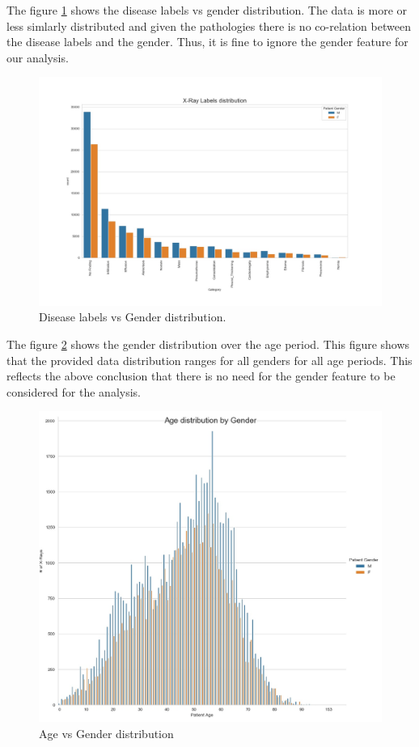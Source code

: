 \documentclass{article}
\begin{document}
    The figure \ref{fig:labels-vs-gender} shows the disease labels vs gender distribution. The data is more or less simlarly distributed and given the pathologies there is no co-relation between the disease labels and the gender. Thus, it is fine to ignore the gender feature for our analysis.

    \begin{figure}
      \includegraphics[width=\linewidth]{./images/labels_vs_gender.jpg}
      \caption{Disease labels vs Gender distribution.}
      \label{fig:labels-vs-gender}
    \end{figure}

    The figure \ref{fig:age-vs-gender} shows the gender distribution over the age period. This figure shows that the provided data distribution ranges for all genders for all age periods. This reflects the above conclusion that there is no need for the gender feature to be considered for the analysis.

    \begin{figure}
      \includegraphics[width=\linewidth]{./images/age_gender_distribution.jpg}
      \caption{Age vs Gender distribution}
      \label{fig:age-vs-gender}
    \end{figure}
\end{document}
